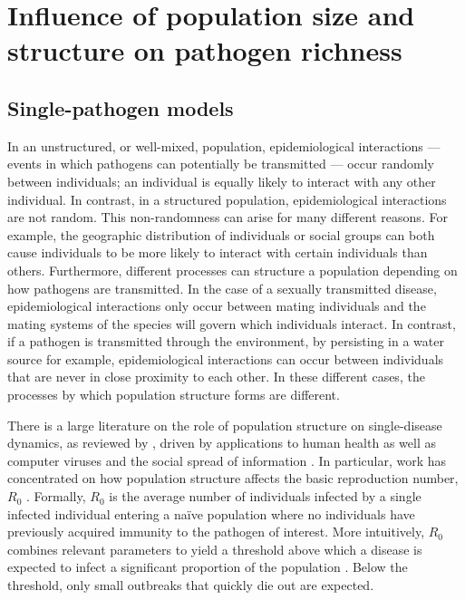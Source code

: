 \section{Influence of population size and structure on pathogen richness}



\subsection{Single-pathogen models}

In an unstructured, or well-mixed, population, epidemiological interactions --- events in which pathogens can potentially be transmitted --- occur randomly between individuals; an individual is equally likely to interact with any other individual.
In contrast, in a structured population, epidemiological interactions are not random.
This non-randomness can arise for many different reasons.
For example, the geographic distribution of individuals or social groups can both cause individuals to be more likely to interact with certain individuals than others.
Furthermore, different processes can structure a population depending on how pathogens are transmitted.
In the case of a sexually transmitted disease, epidemiological interactions only occur between mating individuals and the mating systems of the species will govern which individuals interact.
In contrast, if a pathogen is transmitted through the environment, by persisting in a water source for example, epidemiological interactions can occur between individuals that are never in close proximity to each other.
In these different cases, the processes by which population structure forms are different. %

There is a large literature on the role of population structure on single-disease dynamics, as reviewed by \textcite{pastor2015epidemic}, driven by applications to human health as well as computer viruses \cite{pastor2001epidemic} and the social spread of information \cite{goffman1964generalization}.
In particular, work has concentrated on how population structure affects the basic reproduction number, $R_0$ \cite{colizza2007invasion, barthelemy2010fluctuation, wu2013threshold, may2001infection, pastor2001epidemic}.
Formally, $R_0$ is the average number of individuals infected by a single infected individual entering a na\"ive population where no individuals have previously acquired immunity to the pathogen of interest.
More intuitively, $R_0$ combines relevant parameters to yield a threshold above which a disease is expected to infect a significant proportion of the population \cite{may1979population, anderson1979population}.
Below the threshold, only small outbreaks that quickly die out are expected.

